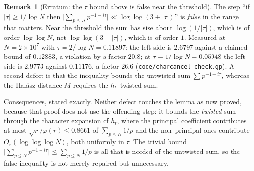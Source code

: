 \documentclass[11pt]{article}
\theoremstyle{definition}
\newtheorem{remark}[theorem]{Remark}
\begin{document}
\begin{remark}[Erratum: the $\tau$ bound above is false near the threshold]\label{rem:charcancelerratum}
The step ``if $|\tau|\ge1/\log N$ then
$\bigl|\sum_{p\le N}p^{-1-i\tau}\bigr|\ll\log\log(3+|\tau|)$'' is \emph{false} in the range that
matters. Near the threshold the sum has size about $\log(1/|\tau|)$, which is of order $\log\log N$,
not $\log\log(3+|\tau|)$, which is of order $1$. Measured at $N=2\times10^{7}$ with
$\tau=2/\log N=0.11897$: the left side is $2.6797$ against a claimed bound of $0.12883$, a violation
by a factor $20.8$; at $\tau=1/\log N=0.05948$ the left side is $2.9773$ against $0.11176$, a factor
$26.6$ \textup{(\texttt{code/charcancel\_check.gp})}. A second defect is that the inequality bounds the
untwisted sum $\sum p^{-1-i\tau}$, whereas the Hal\'asz distance $M$ requires the $h_t$--twisted sum.

Consequences, stated exactly. Neither defect touches the lemma as now proved, because that proof
does not use the offending step: it bounds the \emph{twisted} sum through the character expansion of
$h_t$, where the principal coefficient contributes at most $\sqrt r/\varphi(r)\le0.8661$ of
$\sum_{p\le N}1/p$ and the non--principal ones contribute $O_r(\log\log\log N)$, both uniformly in
$\tau$. The
trivial bound $\bigl|\sum_{p\le N}p^{-1-i\tau}\bigr|\le\sum_{p\le N}1/p$ is all that is needed of the
untwisted sum, so the false inequality is not merely repaired but unnecessary.


\end{remark}
\end{document}
